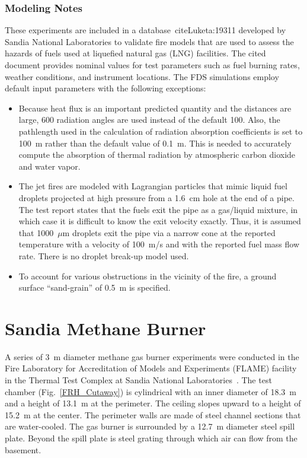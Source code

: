 \subsubsection{Modeling Notes}

These experiments are included in a database~cite{Luketa:19311} developed by Sandia National Laboratories to validate fire models that are used to assess the hazards of fuels used at liquefied natural gas (LNG) facilities. The cited document provides nominal values for test parameters such as fuel burning rates, weather conditions, and instrument locations. The FDS simulations employ default input parameters with the following exceptions:
\begin{itemize}
\item Because heat flux is an important predicted quantity and the distances are large, 600 radiation angles are used instead of the default 100. Also, the pathlength used in the calculation of radiation absorption coefficients is set to 100~m rather than the default value of 0.1~m. This is needed to accurately compute the absorption of thermal radiation by atmospheric carbon dioxide and water vapor. 
\item The jet fires are modeled with Lagrangian particles that mimic liquid fuel droplets projected at high pressure from a 1.6~cm hole at the end of a pipe. The test report states that the fuels exit the pipe as a gas/liquid mixture, in which case it is difficult to know the exit velocity exactly. Thus, it is assumed that 1000~$\mu$m droplets exit the pipe via a narrow cone at the reported temperature with a velocity of 100~m/s and with the reported fuel mass flow rate. There is no droplet break-up model used. 
\item To account for various obstructions in the vicinity of the fire, a ground surface ``sand-grain''  of 0.5~m is specified.
\end{itemize}



\section{Sandia Methane Burner}
\label{Sandia_Methane_Burner_Description}

A series of 3~m diameter methane gas burner experiments were conducted in the Fire Laboratory for Accreditation of Models and Experiments (FLAME) facility in the Thermal Test Complex at Sandia National Laboratories~\cite{Blanchat:2011}. The test chamber (Fig.~\ref{FRH_Cutaway}) is cylindrical with an inner diameter of 18.3~m and a height of 13.1~m at the perimeter. The ceiling slopes upward to a height of 15.2~m at the center. The perimeter walls are made of steel channel sections that are water-cooled. The gas burner is surrounded by a 12.7~m diameter steel spill plate. Beyond the spill plate is steel grating through which air can flow from the basement.


